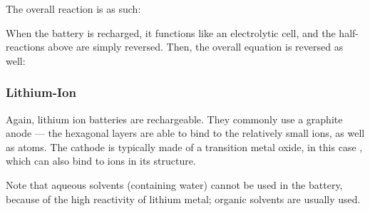 				The overall reaction is as such:


				When the battery is recharged, it functions like an electrolytic cell, and the half-reactions above are simply reversed. Then,
				the overall equation is reversed as well:





			\subsubsection{Lithium-Ion}

				Again, lithium ion batteries are rechargeable. They commonly use a graphite anode --- the hexagonal layers are able to bind
				to the relatively small  ions, as well as  atoms. The cathode is typically made of a transition metal oxide,
				in this case , which can also bind to  ions in its structure.

				Note that aqueous solvents (containing water) cannot be used in the battery, because of the high reactivity of lithium metal;
				organic solvents are usually used.


